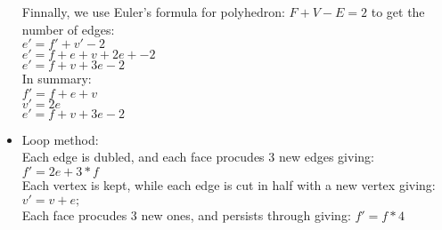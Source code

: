 \begin{itemize}
Finnally, we use Euler's formula for polyhedron: $F+V-E=2$ to get the number of edges: \\
$e'=f'+v'-2$ \\
$e'=f+e+v + 2e + -2$ \\
$e'= f + v + 3e -2$ \\


In summary: \\
$f' = f + e + v$ \\
$v' = 2e$ \\
$e'= f + v + 3e -2$ \\

\item Loop method: \\
Each edge is dubled, and each face procudes 3 new edges giving:
$f' = 2e + 3*f$ \\
Each vertex is kept, while each edge is cut in half with a new vertex giving:
$v' = v+e;$ \\
Each face procudes 3 new ones, and persists through giving:
 $f' = f*4$ \\
\end{itemize}
